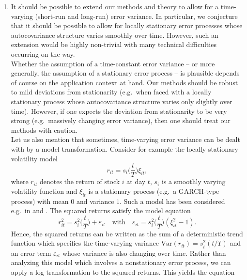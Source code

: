 \documentclass[a4paper,12pt]{article}
\begin{document}
\begin{enumerate}[label=\arabic*.,leftmargin=0.6cm]
\begin{enumerate}[label=(\roman*),leftmargin=0.75cm,topsep=0pt]
\item It should be possible to extend our methods and theory to allow for a time-varying (short-run and long-run) error variance. In particular, we conjecture that it should be possible to allow for locally stationary error processes whose autocovariance structure varies smoothly over time. 
However, such an extension would be highly non-trivial with many technical difficulties occurring on the way. \\
Whether the assumption of a time-constant error variance -- or more generally, the assumption of a stationary error process -- is plausible depends of course on the application context at hand. Our methods should be robust to mild deviations from stationarity (e.g.\ when faced with a locally stationary process whose autocovariance structure varies only slightly over time). However, if one expects the deviation from stationarity to be very strong (e.g.\ massively changing error variance), then one should treat our methods with caution. \\
Let us also mention that sometimes, time-varying error variance can be dealt with by a model transformation. Consider for example the locally stationary volatility model
\begin{equation}\label{eq:volatility-model} 
r_{it} = s_i\Big(\frac{t}{T}\Big) \xi_{it}, 
\end{equation}
where $r_{it}$ denotes the return of stock $i$ at day $t$, $s_i$ is a smoothly varying volatility function and $\xi_{it}$ is a stationary process (e.g.\ a GARCH-type process) with mean $0$ and variance $1$. Such a model has been considered e.g.\ in \cite{Feng2004} and \cite{HafnerLinton2010}. The squared returns satisfy the model equation
\[ r_{it}^2 = s_i^2\Big(\frac{t}{T}\Big) + \varepsilon_{it} \quad \text{with} \quad \varepsilon_{it} = s_i^2\Big(\frac{t}{T}\Big) (\xi_{it}^2 - 1). \]
Hence, the squared returns can be written as the sum of a deterministic trend function which specifies the time-varying variance $\text{Var}(r_{it}) = s_i^2(t/T)$ and an error term $\varepsilon_{it}$ whose variance is also changing over time. Rather than analyzing this model which involves a nonstationary error process, we can apply a log-transformation to the squared returns. This yields the equation 

\end{enumerate}
\end{enumerate}
\end{document}
